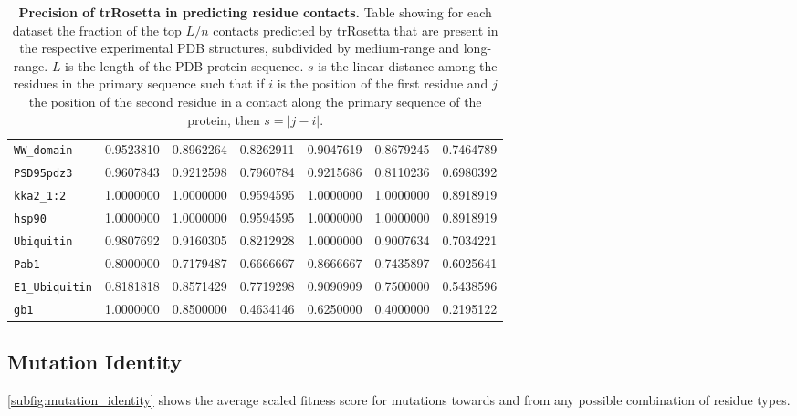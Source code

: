 \begin{table}[p]
{\begin{tabular*}{\linewidth}{@{\extracolsep{\fill}}lrrrrrr}
			\texttt{WW\_domain}     & \num{0.9523810} & \num{0.8962264} & \num{0.8262911} & \num{0.9047619} & \num{0.8679245} & \num{0.7464789} \\
			\texttt{PSD95pdz3}      & \num{0.9607843} & \num{0.9212598} & \num{0.7960784} & \num{0.9215686} & \num{0.8110236} & \num{0.6980392} \\
			\texttt{kka2\_1:2}      & \num{1.0000000} & \num{1.0000000} & \num{0.9594595} & \num{1.0000000} & \num{1.0000000} & \num{0.8918919} \\
			\texttt{hsp90}          & \num{1.0000000} & \num{1.0000000} & \num{0.9594595} & \num{1.0000000} & \num{1.0000000} & \num{0.8918919} \\
			\texttt{Ubiquitin}      & \num{0.9807692} & \num{0.9160305} & \num{0.8212928} & \num{1.0000000} & \num{0.9007634} & \num{0.7034221} \\
			\texttt{Pab1}           & \num{0.8000000} & \num{0.7179487} & \num{0.6666667} & \num{0.8666667} & \num{0.7435897} & \num{0.6025641} \\
			\texttt{E1\_Ubiquitin}  & \num{0.8181818} & \num{0.8571429} & \num{0.7719298} & \num{0.9090909} & \num{0.7500000} & \num{0.5438596} \\
			\texttt{gb1}            & \num{1.0000000} & \num{0.8500000} & \num{0.4634146} & \num{0.6250000} & \num{0.4000000} & \num{0.2195122} \\
			\bottomrule
		\end{tabular*}%
	}{\caption[Precision of trRosetta in predicting residue contacts]{%
			\textbf{Precision of trRosetta in predicting residue contacts.}
			Table showing for each dataset the fraction of the top $L/n$ contacts predicted by trRosetta that are present in the respective experimental PDB structures, subdivided by medium-range and long-range.
			$L$ is the length of the PDB protein sequence.
			$s$ is the linear distance among the residues in the primary sequence such that if $i$ is the position of the first residue and $j$ the position of the second residue in a contact along the primary sequence of the protein, then $s = |j-i|$.
		}\label{tab:trrosetta_validation}}%
\end{table}

\subsection{Mutation Identity}
\cref{subfig:mutation_identity} shows the average scaled fitness score for mutations towards and from any possible combination of residue types.

